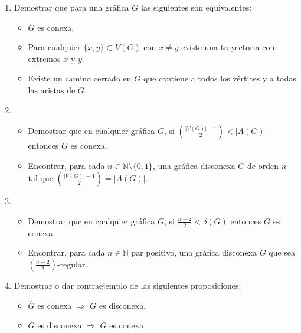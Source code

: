 \documentclass[10pt]{report}
\numberwithin{section}{chapter}
\newcommand{\N}{\mathbb N}
\begin{document}
\begin{enumerate}
\item Demostrar que para una gráfica $G$ las siguientes son equivalentes:
\begin{itemize}
\item $G$ es conexa.
\item Para cualquier $\{x,y\} \subset V(G)$ con $x \neq y$ existe una trayectoria con extremos $x$ y $y$.
\item Existe un camino cerrado en $G$ que contiene a todos los vértices y a todas las aristas de $G$.
\end{itemize}

\item
\begin{itemize}
\item Demostrar que en cualquier gráfica $G$, si ${|V(G)| -1 \choose 2} < |A(G)|$ entonces $G$ es conexa.
\item Encontrar, para cada $n \in \N \setminus \{0,1\}$, una gráfica disconexa $G$ de orden $n$ tal que ${|V(G)| -1 \choose 2} = |A(G)|$.
\end{itemize}

\item
\begin{itemize}
\item Demostrar que en cualquier gráfica $G$, si $\frac{n-2}{2} < \delta(G)$ entonces $G$ es conexa.
\item Encontrar, para cada $n \in \N$ par positivo, una gráfica disconexa $G$ que sea $(\frac{n-2}{2})$-regular.
\end{itemize}

\item Demostrar o dar contraejemplo de las siguientes proposiciones:
\begin{itemize}
\item $\overline{G}$ es conexa $\Rightarrow$ $G$ es disconexa. 
\item $G$ es disconexa $\Rightarrow$ $\overline{G}$ es conexa. 
\end{itemize}



\end{enumerate}
\end{document}

